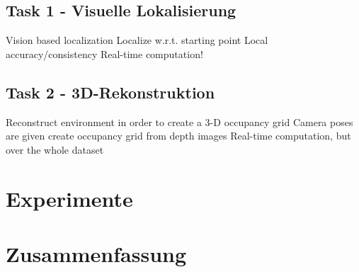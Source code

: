 \subsection{Task 1 - Visuelle Lokalisierung}
Vision based localization
Localize w.r.t. starting point
Local accuracy/consistency
Real-time computation!

				
\subsection{Task 2 - 3D-Rekonstruktion}

Reconstruct environment in order to create a 3-D occupancy grid
Camera poses are given
create occupancy grid from depth images
Real-time computation, but over the whole dataset



\section{Experimente}




\section{Zusammenfassung}



